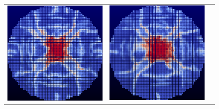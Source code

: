 \begin{figure}
  \centering
  \begin{tabular}{ccc}
  \includegraphics[scale=0.75]{true_soln_1510.eps} &
  \includegraphics[scale=0.75]{true_soln_1511.eps} &

\end{tabular}
\end{figure}
